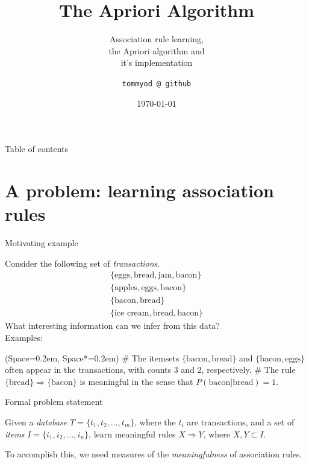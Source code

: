 \documentclass[12pt, aspectratio=1610]{beamer}
\title{The Apriori Algorithm}
\subtitle{Association rule learning, \\the Apriori algorithm and \\it's implementation}
\institute{sdf}
\date{\today}
\author{\texttt{tommyod @ github}}
\newcommand{\listSpace}{0.2em}
\theoremstyle{plain}
\begin{document}
\maketitle
  
\begin{frame}{Table of contents}
	\tableofcontents
\end{frame}

\section{A problem: learning association rules}
\begin{frame}[fragile]{Motivating example}
	
\begin{example}
	Consider the following set of \emph{transactions}.
	\begin{align*}
		\{ \text{eggs}, \text{bread}, \text{jam}, \text{bacon} \} \\ 
		\{ \text{apples} , \text{eggs}, \text{bacon} \} \\
		\{ \text{bacon} , \text{bread} \} \\
		\{ \text{ice cream} , \text{bread}, \text{bacon} \}
	\end{align*}
	What interesting information can we infer from this data? \\
	Examples:
	\begin{easylist}[itemize]
		\ListProperties(Space=\listSpace, Space*=\listSpace)
		# The itemsets $\{ \text{bacon} , \text{bread} \}$ and $\{ \text{bacon}, \text{eggs} \}$ often appear in the transactions, with counts 3 and 2, respectively.
		# The rule $\{ \text{bread} \} \Rightarrow \{ \text{bacon} \}$ is meaningful in the sense that $P(\text{bacon} | \text{bread}) = 1$.
	\end{easylist}
	
\end{example}
\end{frame}

\begin{frame}[fragile]{Formal problem statement}
	
	\begin{problem}
		Given a \emph{database} $T = \{t_1, t_2, \ldots, t_m\}$, where the $t_i$ are transactions, and a set of \emph{items} $I=\{i_1, i_2,\ldots,i_n\}$, learn meaningful rules $X \Rightarrow Y$, where $X, Y \subset I$.
	\end{problem}

	To accomplish this, we need measures of the \emph{meaningfulness} of association rules.
\end{frame}
\end{document}
